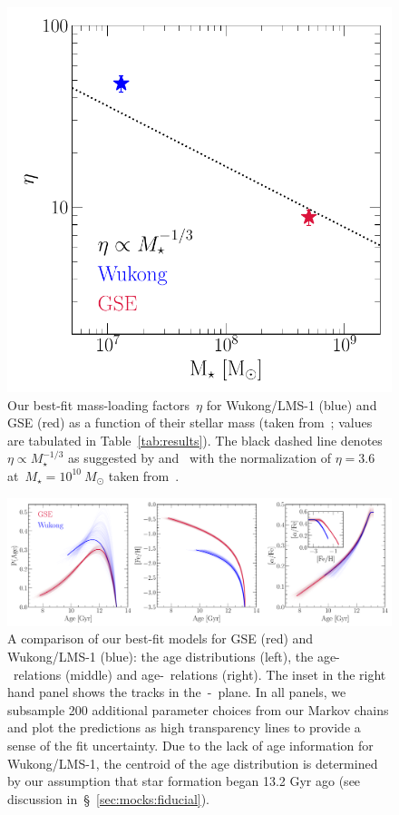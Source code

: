 \documentclass[ms.tex]{subfiles}
\begin{document}
\begin{figure}
\centering
\includegraphics[scale = 0.6]{gse_wukong_eta.pdf}
\caption{
Our best-fit mass-loading factors~$\eta$ for Wukong/LMS-1 (blue) and GSE (red) as
a function of their stellar mass (taken from~\citealt{Naidu2022}; values are
tabulated in Table~\ref{tab:results}).
The black dashed line denotes~$\eta \propto M_\star^{-1/3}$ as suggested by
\citet{Finlator2008} and~\citet{Peeples2011} with the normalization of
$\eta = 3.6$ at~$M_\star = 10^{10}~M_\odot$ taken from~\citet{Muratov2015}.
}
\label{fig:gse_wukong_eta}
\end{figure}

\begin{figure}
\centering
\includegraphics[scale = 0.45]{gse_wukong_comparison.pdf}
\caption{
A comparison of our best-fit models for GSE (red) and Wukong/LMS-1 (blue): the
age distributions (left), the age-\feh~relations (middle) and age-\afe~relations
(right).
The inset in the right hand panel shows the tracks in the~\afe-\feh~plane.
In all panels, we subsample 200 additional parameter choices from our Markov
chains and plot the predictions as high transparency lines to provide a sense
of the fit uncertainty.
Due to the lack of age information for Wukong/LMS-1, the centroid of the age
distribution is determined by our assumption that star formation began 13.2
Gyr ago (see discussion in~\S~\ref{sec:mocks:fiducial}).
}
\label{fig:comparison}
\end{figure}
\end{document}
